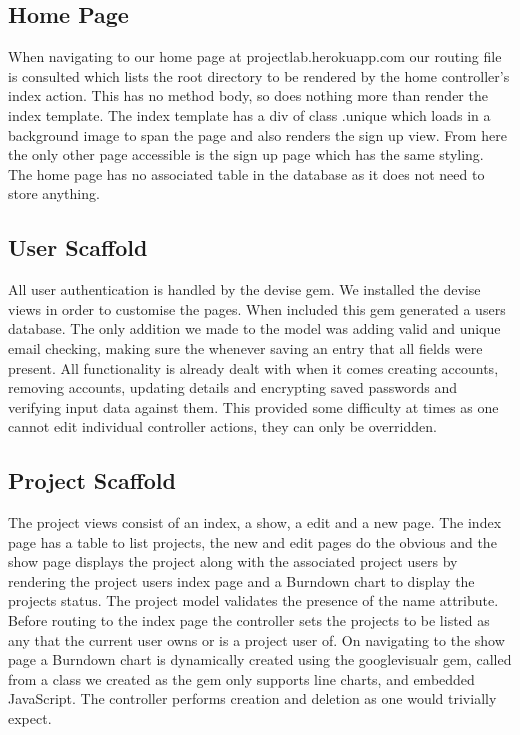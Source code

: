 \documentclass[a4wide, 11pt]{article}
\begin{document}
\subsection{Home Page}
When navigating to our home page at projectlab.herokuapp.com our routing file is consulted which lists the root directory to be rendered by the home controller’s index action. This has no method body, so does nothing more than render the index template. The index template has a div of class .unique which loads in a background image to span the page and also renders the sign up view. From here the only other page accessible is the sign up page which has the same styling. The home page has no associated table in the database as it does not need to store anything.

\subsection{User Scaffold}
All user authentication is handled by the devise gem. We installed the devise views in order to customise the pages. When included this gem generated a users database. The only addition we made to the model was adding valid and unique email checking, making sure the whenever saving an entry that all fields were present. All functionality is already dealt with when it comes creating accounts, removing accounts, updating details and encrypting saved passwords and verifying input data against them. This provided some difficulty at times as one cannot edit individual controller actions, they can only be overridden.

\subsection{Project Scaffold}
The project views consist of an index, a show, a edit and a new page. The index page has a table to list projects, the new and edit pages do the obvious and the show page displays the project along with the associated project users by rendering the project users index page and a Burndown chart to display the projects status. The project model validates the presence of the name attribute. Before routing to the index page the controller sets the projects to be listed as any that the current user owns or is a project user of. On navigating to the show page a Burndown chart is dynamically created using the googlevisualr gem, called from a class we created as the gem only supports line charts, and embedded JavaScript. The controller performs creation and deletion as one would trivially expect.
\end{document}
